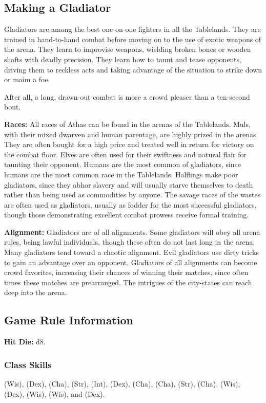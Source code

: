 \subsection{Making a Gladiator}
Gladiators are among the best one-on-one fighters in all the Tablelands. They are trained in hand-to-hand combat before moving on to the use of exotic weapons of the arena. They learn to improvise weapons, wielding broken bones or wooden shafts with deadly precision. They learn how to taunt and tease opponents, driving them to reckless acts and taking advantage of the situation to strike down or maim a foe.

After all, a long, drawn-out combat is more a crowd pleaser than a ten-second bout.

\textbf{Races:} All races of Athas can be found in the arenas of the Tablelands. Muls, with their mixed dwarven and human parentage, are highly prized in the arenas. They are often bought for a high price and treated well in return for victory on the combat floor. Elves are often used for their swiftness and natural flair for taunting their opponent. Humans are the most common of gladiators, since humans are the most common race in the Tablelands. Halflings make poor gladiators, since they abhor slavery and will usually starve themselves to death rather than being used as commodities by anyone. The savage races of the wastes are often used as gladiators, usually as fodder for the most successful gladiators, though those demonstrating excellent combat prowess receive formal training.

\textbf{Alignment:} Gladiators are of all alignments. Some gladiators will obey all arena rules, being lawful individuals, though these often do not last long in the arena. Many gladiators tend toward a chaotic alignment. Evil gladiators use dirty tricks to gain an advantage over an opponent. Gladiators of all alignments can become crowd favorites, increasing their chances of winning their matches, since often times these matches are prearranged. The intrigues of the city-states can reach deep into the arena.

\subsection{Game Rule Information}
\textbf{Hit Die:} d8.

\subsubsection{Class Skills}
 (Wis),  (Dex),  (Cha),  (Str),  (Int),  (Dex),  (Cha),  (Cha),  (Str),  (Cha),  (Wis),  (Dex),  (Wis),  (Wis), and  (Dex).

